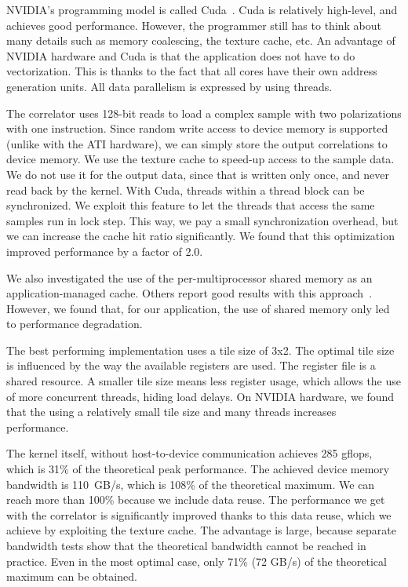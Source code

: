\documentclass{article}
\begin{document}
NVIDIA's programming model is called Cuda~\cite{cuda-manual}.
Cuda is relatively high-level, and achieves good performance.
However, the programmer still has to think about many details such as
memory coalescing, the texture cache, etc.
An advantage of NVIDIA hardware and Cuda is that the application does not have to do 
vectorization. This is thanks to the fact that all cores have their own address generation units. 
All data parallelism is expressed by using threads.

The correlator uses 128-bit reads to load a complex sample with two
polarizations with one instruction.  Since random write access to
device memory is supported (unlike with the ATI hardware), we can
simply store the output correlations to device memory.  We use the
texture cache to speed-up access to the sample data. We do not use it for the
output data, since that is written only once, and never read back by the kernel. 
With Cuda, threads
within a thread block can be synchronized.  We exploit this feature to let
the threads that access the same samples run in lock step.  This way,
we pay a small synchronization overhead, but we can increase the cache hit
ratio significantly.  We found that this optimization improved performance by a factor of 2.0.

We also investigated the use of the per-multiprocessor shared memory as an
application-managed cache.  Others report good results with this
approach~\cite{gpu-cache}.  However, we found that, for our
application, the use of shared memory only led to performance
degradation.

The best performing
implementation uses a tile size of 3x2.
The optimal tile size is influenced by the way the available registers are used.
The register file is a shared resource. A smaller tile size means less register usage, 
which allows the use of more concurrent threads, hiding load delays.
On NVIDIA hardware, we found that the using a relatively small tile size and many threads increases performance.

The kernel itself, without host-to-device communication achieves 285
gflops, which is 31\% of the theoretical peak performance. The
achieved device memory bandwidth is 110~GB/s, which is 108\% of the
theoretical maximum. We can reach more than 100\% because we include data reuse.
The performance we get with the correlator is significantly
improved thanks to this data reuse, which we achieve by exploiting the texture cache.
The advantage is large, because separate bandwidth tests show that the theoretical
bandwidth cannot be reached in practice. Even in the most optimal case, only 71\% (72 GB/s) of the 
theoretical maximum can be obtained. 
\end{document}
